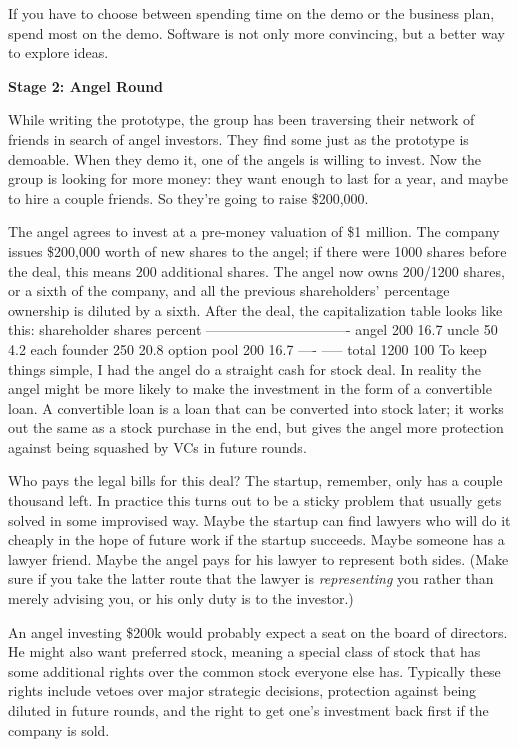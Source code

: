 If you have to choose between spending time on the demo or the business
plan, spend most on the demo. Software is not only more convincing, but
a better way to explore ideas.

\textbf{Stage 2: Angel Round}

While writing the prototype, the group has been traversing their network
of friends in search of angel investors. They find some just as the
prototype is demoable. When they demo it, one of the angels is willing
to invest. Now the group is looking for more money: they want enough to
last for a year, and maybe to hire a couple friends. So they're going to
raise \$200,000.

The angel agrees to invest at a pre-money valuation of \$1 million. The
company issues \$200,000 worth of new shares to the angel; if there were
1000 shares before the deal, this means 200 additional shares. The angel
now owns 200/1200 shares, or a sixth of the company, and all the
previous shareholders' percentage ownership is diluted by a sixth. After
the deal, the capitalization table looks like this: shareholder shares
percent ------------------------------- angel 200 16.7 uncle 50 4.2 each
founder 250 20.8 option pool 200 16.7 ---- ----- total 1200 100 To keep
things simple, I had the angel do a straight cash for stock deal. In
reality the angel might be more likely to make the investment in the
form of a convertible loan. A convertible loan is a loan that can be
converted into stock later; it works out the same as a stock purchase in
the end, but gives the angel more protection against being squashed by
VCs in future rounds.

Who pays the legal bills for this deal? The startup, remember, only has
a couple thousand left. In practice this turns out to be a sticky
problem that usually gets solved in some improvised way. Maybe the
startup can find lawyers who will do it cheaply in the hope of future
work if the startup succeeds. Maybe someone has a lawyer friend. Maybe
the angel pays for his lawyer to represent both sides. (Make sure if you
take the latter route that the lawyer is \emph{representing} you rather
than merely advising you, or his only duty is to the investor.)

An angel investing \$200k would probably expect a seat on the board of
directors. He might also want preferred stock, meaning a special class
of stock that has some additional rights over the common stock everyone
else has. Typically these rights include vetoes over major strategic
decisions, protection against being diluted in future rounds, and the
right to get one's investment back first if the company is sold.

